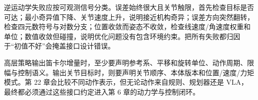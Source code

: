 逆运动学失败应按可观测信号分类。误差始终很大且关节触限，首先检查目标是否可达；最小奇异值下降、关节速度上升，说明接近机构奇异；误差方向突然翻转，检查四元数符号与对数分支；位置收敛而姿态不收敛，检查线速度/角速度权重和单位；数值收敛但碰撞，说明优化问题没有包含环境约束。把所有失败都归因于“初值不好”会掩盖接口设计错误。

高层策略输出笛卡尔增量时，至少要声明参考系、平移和旋转单位、动作周期、限幅与控制语义。输出关节目标时，则要声明关节顺序、本体版本和位置/速度/力矩模式。第 22 章会比较不同动作表示，但无论动作来自规则、规划器还是 VLA，最终都必须通过这些接口约定进入第 6 章的动力学与控制闭环。

